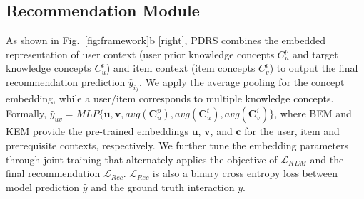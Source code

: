 \subsection{Recommendation Module}
\label{sec:module3}
As shown in Fig.~\ref{fig:framework}b [right],
PDRS combines the embedded representation of user context (user prior knowledge concepts $C^p_u$ and target knowledge concepts $C^t_u$) and item context (item concepts $C_v^i$) to output the final recommendation prediction $\hat{y}_{ij}$. We apply the average pooling for the concept embedding, while a user/item corresponds to multiple knowledge concepts. Formally, $\hat{y}_{uv}=MLP\{\mathbf{u}, \mathbf{v}, avg(\mathbf{C}^p_u), avg(\mathbf{C}^t_u), avg(\mathbf{C}_v^i)\}$,
where BEM and KEM provide the pre-trained embeddings $\mathbf{u}$, $\mathbf{v}$, and $\mathbf{c}$ for the user, item and prerequisite contexts, respectively.
We further tune the embedding parameters through joint training that alternately applies the objective of $\mathcal{L}_{KEM}$ and the final recommendation $\mathcal{L}_{Rec}$.  $\mathcal{L}_{Rec}$ is also a binary cross entropy loss between model prediction $\hat{y}$ and the ground truth interaction $y$.


